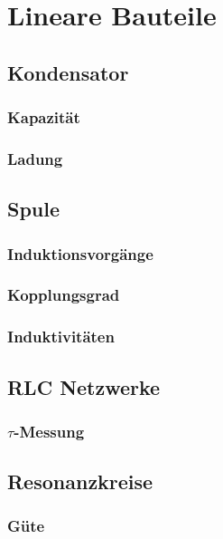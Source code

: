 \chapter{Lineare Bauteile}

\section{Kondensator}

\subsection{Kapazität}

\subsection{Ladung}

\section{Spule}

\subsection{Induktionsvorgänge}

\subsection{Kopplungsgrad}

\subsection{Induktivitäten}

\section{RLC Netzwerke}

\subsection{$\tau$-Messung}

\section{Resonanzkreise}

\subsection{Güte}

